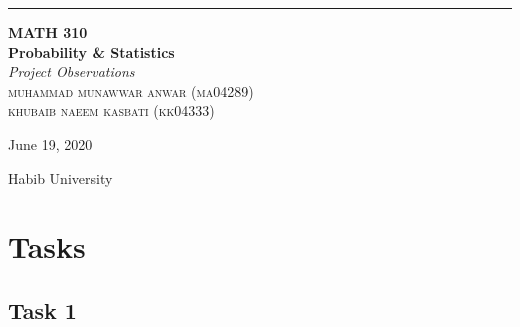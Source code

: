 \documentclass[a4paper, 11pt]{book} %
\begin{document}

\begin{titlepage} %
	
	\raggedleft %
	
	\rule{1pt}{\textheight} %
	\hspace{0.05\textwidth} %
	\parbox[b]{0.75\textwidth}
	{ %
		
		{\Huge\bfseries MATH 310  \\[0.5\baselineskip] Probability \& Statistics}\\[2\baselineskip] %
		{\large\textit{Project Observations}}\\[4\baselineskip] %
		{\Large\textsc{muhammad munawwar anwar (ma04289) \\ khubaib naeem kasbati (kk04333) }} %
		
        {\large June 19, 2020}\\[2cm] %
		\vspace{0.5\textheight} %

		{\noindent Habib University}\\[\baselineskip] %
		
	}
	
    
\end{titlepage}
\tableofcontents




\newpage

\section*{Tasks}


\subsection*{Task 1}
\end{document}
